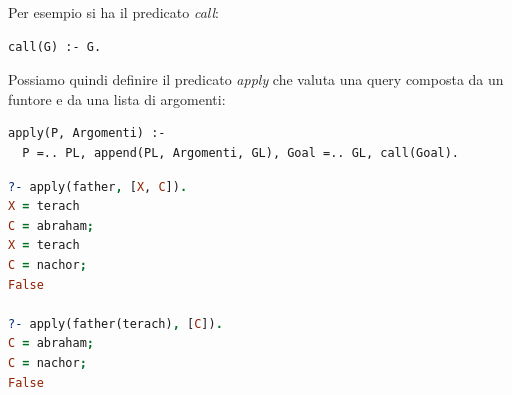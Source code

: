 Per esempio si ha il predicato \textit{call}:
\begin{verbatim}
call(G) :- G.
\end{verbatim}
Possiamo quindi definire il predicato \textit{apply} che valuta una query composta da un funtore e da una lista di argomenti:
\begin{verbatim}
apply(P, Argomenti) :-
  P =.. PL, append(PL, Argomenti, GL), Goal =.. GL, call(Goal).
\end{verbatim}
\begin{shaded}
\begin{lstlisting}[language=prolog]
?- apply(father, [X, C]).
X = terach
C = abraham;
X = terach
C = nachor;
False

?- apply(father(terach), [C]).
C = abraham;
C = nachor;
False
\end{lstlisting}
\end{shaded}
